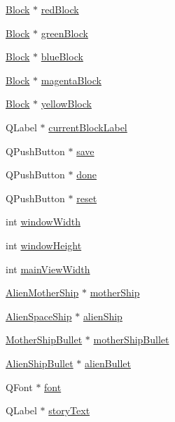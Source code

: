 \begin{DoxyCompactItemize}
\hyperlink{class_block}{Block} $\ast$ \hyperlink{class_form_af3d2b490d97327ae579f814e3f620dcb}{redBlock}
\item 
\hyperlink{class_block}{Block} $\ast$ \hyperlink{class_form_aec10e23211aa0c2401b1cf9c7db50396}{greenBlock}
\item 
\hyperlink{class_block}{Block} $\ast$ \hyperlink{class_form_a4bf88e1480c496d5036499150432dff4}{blueBlock}
\item 
\hyperlink{class_block}{Block} $\ast$ \hyperlink{class_form_ae98adaad3d9264c2c76c0977b44943c6}{magentaBlock}
\item 
\hyperlink{class_block}{Block} $\ast$ \hyperlink{class_form_a2e1c5906b9ba37321cb7bab858d895fa}{yellowBlock}
\item 
QLabel $\ast$ \hyperlink{class_form_abafd6277bf46fc8d802467c4aabea50e}{currentBlockLabel}
\item 
QPushButton $\ast$ \hyperlink{class_form_a1bdf42fb82d80d614324a9a0cd7b960e}{save}
\item 
QPushButton $\ast$ \hyperlink{class_form_a7c08dcd5710197574486d9ea139de923}{done}
\item 
QPushButton $\ast$ \hyperlink{class_form_a651bf23926cdc9be577fa056ef15638f}{reset}
\item 
int \hyperlink{class_form_a0f3a6be75fa8dcc00127c1d735f5d650}{windowWidth}
\item 
int \hyperlink{class_form_addbe1e71147359d087fa7f66ea4aec50}{windowHeight}
\item 
int \hyperlink{class_form_a132aa4e6d4dcdbdde29762fcc6497cac}{mainViewWidth}
\item 
\hyperlink{class_alien_mother_ship}{AlienMotherShip} $\ast$ \hyperlink{class_form_a39ad83a17a081174bca47eba9b38f0b9}{motherShip}
\item 
\hyperlink{class_alien_space_ship}{AlienSpaceShip} $\ast$ \hyperlink{class_form_a65c28753832fba6be96e0a48396b5c9b}{alienShip}
\item 
\hyperlink{class_mother_ship_bullet}{MotherShipBullet} $\ast$ \hyperlink{class_form_ad6ddaf1cdc66b62a9f1b59a32ca818f6}{motherShipBullet}
\item 
\hyperlink{class_alien_ship_bullet}{AlienShipBullet} $\ast$ \hyperlink{class_form_aeacd1539514074613bf55a46da8680c9}{alienBullet}
\item 
QFont $\ast$ \hyperlink{class_form_afae663257f81258f2f8667d621fe0f48}{font}
\item 
QLabel $\ast$ \hyperlink{class_form_a4fda691b1a4b71eb73fe89d055e9b651}{storyText}
\item 

\end{DoxyCompactItemize}
